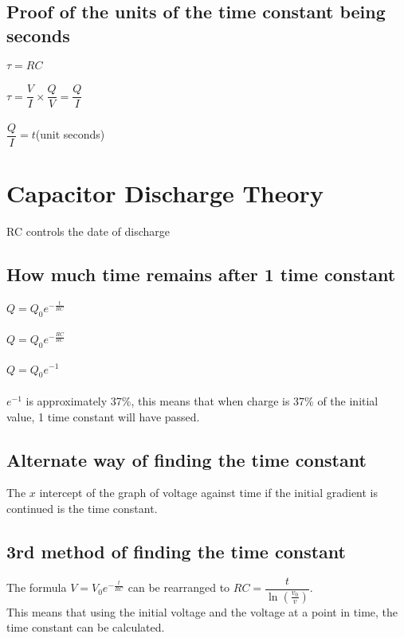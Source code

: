 \documentclass{article}[18pt]
\begin{document}
\subsection{Proof of the units of the time constant being seconds}
$\tau=RC$\\\\
$\tau=\dfrac{V}{I}\times\dfrac{Q}{V}=\dfrac{Q}{I}$\\
\\
$\dfrac{Q}{I}=t$(unit seconds)
\section{Capacitor Discharge Theory}
RC controls the date of discharge
\subsection{How much time remains after 1 time constant}
$Q=Q_0e^{-\frac{t}{RC}}$\\
\\
$Q=Q_0e^{-\frac{RC}{RC}}$\\
\\
$Q=Q_0e^{-1}$\\
\\
$e^{-1}$ is approximately 37\%, this means that when charge is 37\% of the initial value, 1 time constant will have passed.
\subsection{Alternate way of finding the time constant}
The $x$ intercept of the graph of voltage against time if the initial gradient is continued is the time constant.
\subsection{3rd method of finding the time constant}
The formula $V=V_0e^{-\frac{t}{RC}}$ can be rearranged to $RC=\dfrac{t}{\ln(\frac{v_0}{v})}$.\\
This means that using the initial voltage and the voltage at a point in time, the time constant can be calculated.
\end{document}
